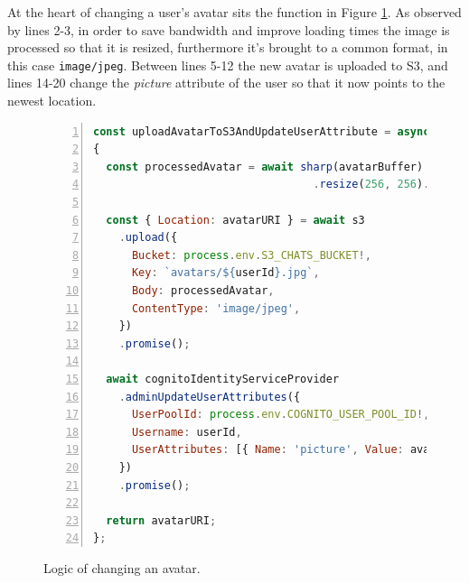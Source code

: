 At the heart of changing a user's avatar sits the function in Figure \ref{figure:backend-rest-api-avatar}. As observed by lines 2-3, in order to save bandwidth and improve loading times the image is processed so that it is resized, furthermore it's brought to a common format, in this case \verb|image/jpeg|. Between lines 5-12 the new avatar is uploaded to S3, and lines 14-20 change the \textit{picture} attribute of the user so that it now points to the newest location.


\begin{figure}[H]
\begin{lstlisting}[numbers=left,basicstyle=\small,language=JavaScript]
const uploadAvatarToS3AndUpdateUserAttribute = async (userId, avatarBuffer) => 
{
  const processedAvatar = await sharp(avatarBuffer)
                                  .resize(256, 256).jpeg().toBuffer();

  const { Location: avatarURI } = await s3
    .upload({
      Bucket: process.env.S3_CHATS_BUCKET!,
      Key: `avatars/${userId}.jpg`,
      Body: processedAvatar,
      ContentType: 'image/jpeg',
    })
    .promise();

  await cognitoIdentityServiceProvider
    .adminUpdateUserAttributes({
      UserPoolId: process.env.COGNITO_USER_POOL_ID!,
      Username: userId,
      UserAttributes: [{ Name: 'picture', Value: avatarURI }],
    })
    .promise();

  return avatarURI;
};
\end{lstlisting}
\caption{Logic of changing an avatar.}
\label{figure:backend-rest-api-avatar}
\end{figure}










